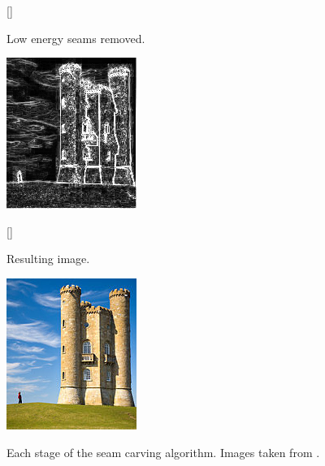 \begin{figure}[htp]
    \begin{subfloatrow}
        [\FBwidth]
        {\caption{Low energy seams removed.}\label{fig:scRemoved}}
        {\includegraphics[scale=.7]{figures/seamCarving4.png}}
    \end{subfloatrow}
    \begin{subfloatrow}
        [\FBwidth]
        {\caption{Resulting image.}}
        {\includegraphics[scale=.7]{figures/seamCarving5.png}}
    \end{subfloatrow}
    \caption[Seam Carving Stages]{Each stage of the seam carving algorithm. Images taken from \cite{wikiSeamCarving}.}
\end{figure}

\setlength{\leftskip}{0cm}
